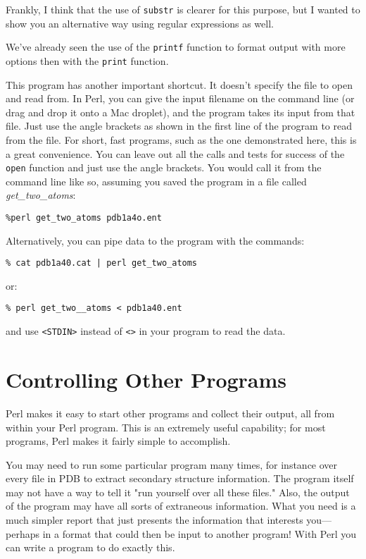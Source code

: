 Frankly, I think that the use of \verb|substr| is clearer for this purpose, but I wanted to show you an alternative way using regular expressions as well.

We've already seen the use of the \verb|printf| function to format output with more options then with the \verb|print| function.

This program has another important shortcut. It doesn't specify the file to open and read from. In Perl, you can give the input filename on the command line (or drag and drop it onto a Mac droplet), and the program takes its input from that file. Just use the angle brackets as shown in the first line of the program to read from the file. For short, fast programs, such as the one demonstrated here, this is a great convenience. You can leave out all the calls and tests for success of the \verb|open| function and just use the angle brackets. You would call it from the command line like so, assuming you saved the program in a file called \textit{get\_two\_atoms}: 

\begin{lstlisting}
%perl get_two_atoms pdb1a4o.ent
\end{lstlisting}

Alternatively, you can pipe data to the program with the commands:

\begin{lstlisting}
% cat pdb1a40.cat | perl get_two_atoms
\end{lstlisting}

or:

\begin{lstlisting}
% perl get_two__atoms < pdb1a40.ent 
\end{lstlisting}

and use \verb|<STDIN>| instead of \verb|<>| in your program to read the data. 

\section{Controlling Other Programs}
Perl makes it easy to start other programs and collect their output, all from within your Perl program. This is an extremely useful capability; for most programs, Perl makes it fairly simple to accomplish.

You may need to run some particular program many times, for instance over every file in PDB to extract secondary structure information. The program itself may not have a way to tell it "run yourself over all these files." Also, the output of the program may have all sorts of extraneous information. What you need is a much simpler report that just presents the information that interests you—perhaps in a format that could then be input to another program! With Perl you can write a program to do exactly this.

